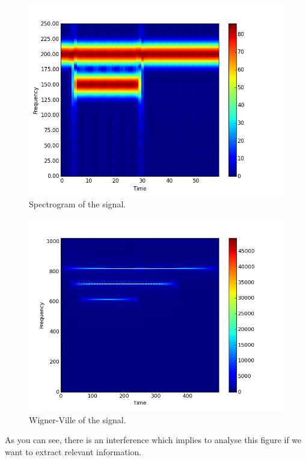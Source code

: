 \begin{figure}[H]
\centering
    \includegraphics[scale=0.5,angle=0]{Images/figure_6STFT.png}
    \caption{Spectrogram of the signal.}
    \label{fig:SignalSimple_Spectrogram}
\end{figure}

\begin{figure}[H]
\centering
    \includegraphics[scale=0.5,angle=0]{Images/SignalSimple_WV.png}
    \caption{Wigner-Ville of the signal.}
    \label{fig:SignalSimple_WV}
\end{figure}

As you can see, there is an interference which implies to analyse this figure if we want to extract relevant information.

